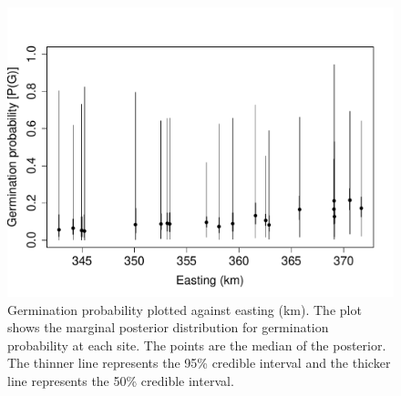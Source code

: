 \documentclass[12pt, oneside, titlepage]{article}   	%
\begin{document}
 \begin{figure}[h]
   \centering
       \includegraphics[page=1,width=1\textwidth]{../figures/spatial-g1.pdf}  
    \caption{ Germination probability plotted against easting (km). The plot shows the marginal posterior distribution for germination probability at each site. The points are the median of the posterior. The thinner line represents the 95\% credible interval and the thicker line represents the 50\% credible interval. }
 \label{fig:test}
\end{figure}
\end{document}
